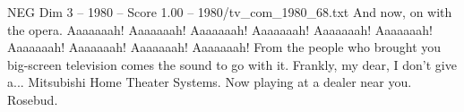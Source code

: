 \begin{textsample}{NEG Dim 3 – 1980 – Score 1.00 – 1980/tv\_com\_1980\_68.txt}  \label{ex:f3_neg_046}
And now, on with the opera.
Aaaaaaah!
Aaaaaaah!
Aaaaaaah!
Aaaaaaah!
Aaaaaaah!
Aaaaaaah!
Aaaaaaah!
Aaaaaaah!
Aaaaaaah!
Aaaaaaah!
From the people who brought you big-screen television comes the sound to go with it.
Frankly, my dear, I don't give a...
Mitsubishi Home Theater Systems.
Now playing at a dealer near you.
Rosebud.

\end{textsample}
